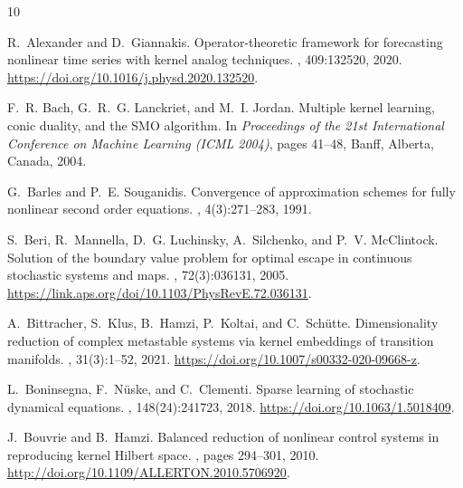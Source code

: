 \begin{thebibliography}{10}

R.~Alexander and D.~Giannakis.
\newblock Operator-theoretic framework for forecasting nonlinear time series
  with kernel analog techniques.
, 409:132520, 2020.
\newblock \url{https://doi.org/10.1016/j.physd.2020.132520}.

F.~R. Bach, G.~R.~G. Lanckriet, and M.~I. Jordan.
\newblock Multiple kernel learning, conic duality, and the {SMO} algorithm.
\newblock In {\em Proceedings of the 21st International Conference on Machine
  Learning ({ICML} 2004)}, pages 41--48, Banff, Alberta, Canada, 2004.

\begingroup\color{blue}
G.~Barles and P.~E. Souganidis.
\newblock Convergence of approximation schemes for fully nonlinear second order
  equations.
, 4(3):271--283, 1991.
\par\endgroup

S.~Beri, R.~Mannella, D.~G. Luchinsky, A.~Silchenko, and P.~V. McClintock.
\newblock Solution of the boundary value problem for optimal escape in
  continuous stochastic systems and maps.
, 72(3):036131, 2005.
\newblock \url{https://link.aps.org/doi/10.1103/PhysRevE.72.036131}.

A.~Bittracher, S.~Klus, B.~Hamzi, P.~Koltai, and C.~Sch{\"u}tte.
\newblock Dimensionality reduction of complex metastable systems via kernel
  embeddings of transition manifolds.
, 31(3):1--52, 2021.
\newblock \url{https://doi.org/10.1007/s00332-020-09668-z}.

L.~Boninsegna, F.~N{\"u}ske, and C.~Clementi.
\newblock Sparse learning of stochastic dynamical equations.
, 148(24):241723, 2018.
\newblock \url{https://doi.org/10.1063/1.5018409}.

J.~Bouvrie and B.~Hamzi.
\newblock Balanced reduction of nonlinear control systems in reproducing kernel
  {H}ilbert space.
, pages 294--301, 2010.
\newblock \url{http://doi.org/10.1109/ALLERTON.2010.5706920}.


\end{thebibliography}
